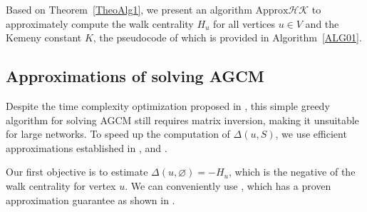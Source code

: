 \documentclass[journal]{IEEEtran}
\begin{document}
Based on Theorem~\ref{TheoAlg1}, we  present an algorithm \(\text{Approx}\mathcal{HK}\) to approximately compute the walk centrality \(H_u\) for all  vertices  \(u \in V\) and the Kemeny constant \(K\), the pseudocode of which is provided in Algorithm~\ref{ALG01}.


\subsection{Approximations of solving AGCM}

Despite the time complexity optimization proposed in , this simple greedy algorithm for solving AGCM still requires matrix inversion, making it unsuitable for large networks.
To speed up the computation of \(\Delta(u,S)\), we use efficient approximations established in ,  and .

Our first objective is to estimate \(\Delta(u,\varnothing)=-H_u\), which is the negative of the walk centrality for vertex \(u\).
We can conveniently use , which has a proven approximation guarantee as shown in .
\end{document}
